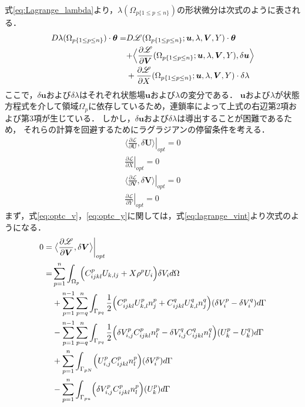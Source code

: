 式\eqref{eq:Lagrange_lambda}より，$\lambda(\Omega_{p\{1\leq p\leq n\}})$の形状微分は次式のように表される．
\begin{align}
	D\lambda(\Omega_{p\{1\leq p\leq n\}})\cdot\bm{\theta}
	=&D\mathscr{L}(\Omega_{p\{1\leq p\leq n\}};\bm{u},\lambda,\bm{V},Y)\cdot\bm{\theta}
	\nonumber
	\\
	&+\Bigr\langle \frac{\partial \mathscr{L}}{\partial \bm{V}}(\Omega_{p\{1\leq p\leq n\}};\bm{u},\lambda,\bm{V},Y),
	\delta\bm{u} \Bigl\rangle
	\nonumber
	\\
	&+\frac{\partial \mathscr{L}}{\partial X}(\Omega_{p\{1\leq p\leq n\}};\bm{u},\lambda,\bm{V},Y)\cdot
	\delta\lambda
	\label{eq:shape_lagrange}
\end{align}
ここで，$\delta\bm{u}$および$\delta\lambda$はそれぞれ状態場$\bm{u}$および$\lambda$の変分である．
$\bm{u}$および$\lambda$が状態方程式を介して領域$\Omega_{p}$に依存しているため，連鎖率によって上式の右辺第2項および第3項が生じている．
しかし，$\delta\bm{u}$および$\delta\lambda$は導出することが困難であるため，
それらの計算を回避するためにラグラジアンの停留条件を考える．
\begin{align}
	\left.\bigr\langle \frac{\partial \mathscr{L}}{\partial \bm{U}},\delta \bm{U} \bigl\rangle\right|_{opt}=0
	\label{eq:optc_u}
	\\
	\left.\frac{\partial\mathscr{L}}{\partial X}\right|_{opt}=0
	\label{eq:optc_x}
	\\
	\left.\bigr\langle \frac{\partial \mathscr{L}}{\partial \bm{V}},\delta \bm{V} \bigl\rangle\right|_{opt}=0
	\label{eq:optc_v}
	\\
	\left.\frac{\partial\mathscr{L}}{\partial Y}\right|_{opt}=0
	\label{eq:optc_y}
\end{align}
まず，式\eqref{eq:optc_v}，\eqref{eq:optc_y}に関しては，式\eqref{eq:lagrange_vint}より次式のようになる．
\begin{align}
	0=&\left.\bigr\langle \frac{\partial \mathscr{L}}{\partial \bm{V}},\delta \bm{V} \bigl\rangle\right|_{opt}
	\nonumber
	\\
	=&\sum_{p=1}^{n}\int_{\Omega_p}\Bigr(C_{ijkl}^{p}U_{k,lj}+X\rho^{p}U_{i}\Bigl)\delta V_{i} d\Omega
	\nonumber
	\\
	&+\sum_{p=1}^{n-1}\sum_{p=q}^{n}\int_{\Gamma_{pq}}\frac{1}{2}\Bigr(C_{ijkl}^{p}U_{k,l}^{p}n_{j}^{p}+C_{ijkl}^{q}U_{k,l}^{q}n_{j}^{q}\Bigl)(\delta V_{i}^{p}-\delta V_{i}^{q}) d\Gamma
	\nonumber
	\\
	&-\sum_{p=1}^{n-1}\sum_{p=q}^{n}\int_{\Gamma_{pq}}\frac{1}{2}\Bigr(\delta V_{i,j}^{p}C_{ijkl}^{p}n_{l}^{p}-\delta V_{i,j}^{q}C_{ijkl}^{q}n_{l}^{q}\Bigl)(U_{k}^{p}-U_{k}^{q})d\Gamma
	\nonumber
	\\
	&+\sum_{p=1}^{n}\int_{\Gamma_{pN}}\Bigr(U_{i,j}^{p}C_{ijkl}^{p}n_{l}^{p}\Bigl)(\delta V_{i}^{p}) d\Gamma
	\nonumber
	\\
	&-\sum_{p=1}^{n}\int_{\Gamma_{pu}}\Bigr(\delta V_{i,j}^{p}C_{ijkl}^{p}n_{l}^{p}\Bigl)(U_{k}^{p}) d\Gamma
	\label{eq:lagrange_vderivative}
\end{align}
